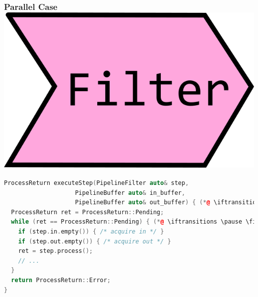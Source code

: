 \documentclass[aspectratio=169]{beamer}
\newif\iftransitions
\begin{document}
\begin{frame}[fragile]
  \frametitle{Parallel Case \hspace{310pt} \includegraphics[height=.1\textheight]{pipelinesgfx/filter.png}}

  \begin{lstlisting}[language={C++}]
ProcessReturn executeStep(PipelineFilter auto& step,
                    PipelineBuffer auto& in_buffer,
                    PipelineBuffer auto& out_buffer) { (*@ \iftransitions \pause \fi @*)
  ProcessReturn ret = ProcessReturn::Pending;
  while (ret == ProcessReturn::Pending) { (*@ \iftransitions \pause \fi @*)
    if (step.in.empty()) { /* acquire in */ }
    if (step.out.empty()) { /* acquire out */ } 
    ret = step.process();
    // ...
  }
  return ProcessReturn::Error;
}
  \end{lstlisting}
\end{frame}
\end{document}
